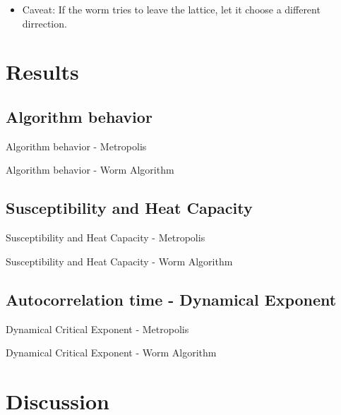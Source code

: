 \documentclass{beamer}
\begin{document}
\begin{frame}
\begin{itemize}
    \item Caveat: If the worm tries to leave the lattice, let it choose a different dirrection.
\end{itemize}
\end{frame}

\section{Results}
\subsection{Algorithm behavior}
\begin{frame}{Algorithm behavior - Metropolis}
    
\end{frame}
\begin{frame}{Algorithm behavior - Worm Algorithm}
    
\end{frame}

\subsection{Susceptibility and Heat Capacity}
\begin{frame}{Susceptibility and Heat Capacity - Metropolis}
\end{frame}
\begin{frame}{Susceptibility and Heat Capacity - Worm Algorithm}
\end{frame}

\subsection{Autocorrelation time - Dynamical Exponent}
\begin{frame}{Dynamical Critical Exponent - Metropolis}    
\end{frame}
\begin{frame}{Dynamical Critical Exponent - Worm Algorithm}
\end{frame}


\section{Discussion}
\end{document}
